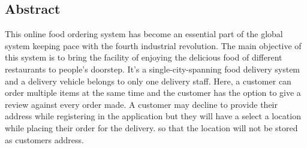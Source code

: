 \begin{center}
    \section*{Abstract}
\end{center}
This online food ordering system has become an essential part of the global system keeping pace with the fourth industrial revolution. The main objective of this system is to bring the facility of enjoying the delicious food of different restaurants to people's doorstep. It’s a single-city-spanning food delivery system and a delivery vehicle belongs to only one delivery staff. Here, a customer can order multiple items at the same time and the customer has the option to give a review against every order made.
A customer may decline to provide their address while registering in the application but they will have  a select a location while placing their order for the delivery. so that the location will not be stored as customers address.